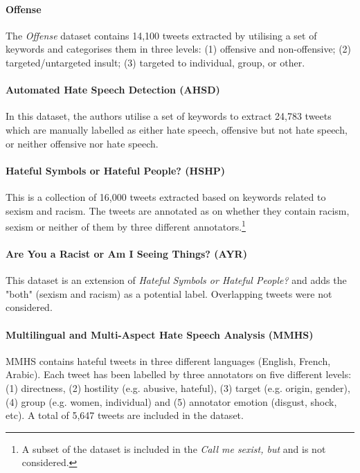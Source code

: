     \paragraph{Offense}
    The \textit{Offense} dataset \cite{zampieri2019predicting} contains 14,100 tweets extracted by utilising a set of keywords and categorises them in three levels: (1) offensive and non-offensive; (2) targeted/untargeted insult; (3) targeted to individual, group, or other. %
    
    \paragraph{Automated Hate Speech Detection (AHSD)}
    In this dataset, \cite{davidson2017automated} the authors utilise a set of keywords to extract 24,783 tweets which are manually labelled as either hate speech, offensive but not hate speech, or neither offensive nor hate speech. %
    
    \paragraph{Hateful Symbols or Hateful People? (HSHP)}
    This is a collection \cite{Talat2016HatefulSO} of 16,000 tweets extracted based on keywords related to sexism and racism. The tweets are annotated as on whether they contain racism, sexism or neither of them by three different annotators.\footnote{A subset of the dataset is included in the \textit{Call me sexist, but} and is not considered.}

    \paragraph{Are You a Racist or Am I Seeing Things? (AYR)}
    This dataset \cite{waseem-2016-racist} is an extension of \textit{Hateful Symbols or Hateful People?} and adds the "both" (sexism and racism) as a potential label. Overlapping tweets were not considered.

    \paragraph{Multilingual and Multi-Aspect Hate Speech Analysis (MMHS)}
    MMHS \cite{ousidhoum-etal-2019-multilingual} contains hateful tweets in three different languages (English, French, Arabic). Each tweet has been labelled by three annotators on five different levels: (1) directness, (2) hostility (e.g. abusive, hateful), (3) target (e.g. origin, gender), (4) group (e.g. women, individual) and (5) annotator emotion (disgust, shock, etc). A total of 5,647 tweets are included in the dataset.

